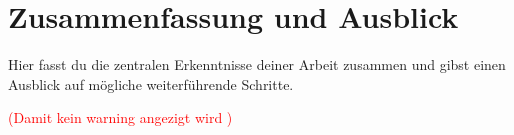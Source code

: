
\section{Zusammenfassung und Ausblick}
\label{chap:zusammenfassung_ausblick}

Hier fasst du die zentralen Erkenntnisse deiner Arbeit zusammen und gibst einen Ausblick auf mögliche weiterführende Schritte.


\textcolor{red}{(Damit kein warning angezigt wird \cite{knuth1984texbook})}
